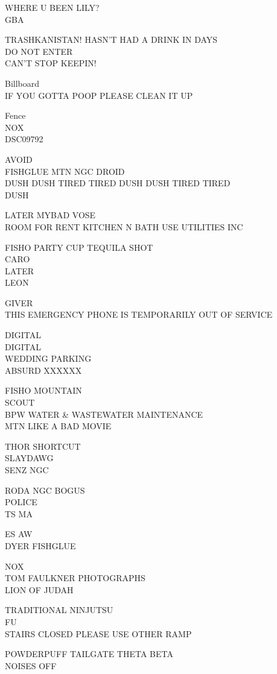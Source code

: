 \documentclass[10pt,letterpaper]{article}
\begin{document}
WHERE U BEEN LILY?\\
GBA

TRASHKANISTAN! HASN'T HAD A DRINK IN DAYS\\
DO NOT ENTER\\
CAN'T STOP KEEPIN!

Billboard\\
IF YOU GOTTA POOP PLEASE CLEAN IT UP

Fence\\
NOX\\
DSC09792

AVOID\\
FISHGLUE MTN NGC DROID\\
DUSH DUSH TIRED TIRED DUSH DUSH TIRED TIRED\\
DUSH

LATER MYBAD VOSE\\
ROOM FOR RENT KITCHEN N BATH USE UTILITIES INC

FISHO PARTY CUP TEQUILA SHOT\\
CARO\\
LATER\\
LEON

GIVER\\
THIS EMERGENCY PHONE IS TEMPORARILY OUT OF SERVICE

DIGITAL\\
DIGITAL\\
WEDDING PARKING\\
ABSURD XXXXXX

FISHO MOUNTAIN\\
SCOUT\\
BPW WATER \& WASTEWATER MAINTENANCE\\
MTN LIKE A BAD MOVIE

THOR SHORTCUT\\
SLAYDAWG\\
SENZ NGC

RODA NGC BOGUS\\
POLICE\\
TS MA

ES AW\\
DYER FISHGLUE

NOX\\
TOM FAULKNER PHOTOGRAPHS\\
LION OF JUDAH

TRADITIONAL NINJUTSU\\
FU\\
STAIRS CLOSED PLEASE USE OTHER RAMP

POWDERPUFF TAILGATE THETA BETA\\
NOISES OFF
\end{document}
